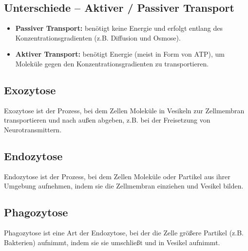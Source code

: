 \documentclass{article}
\begin{document}
\newpage
\subsection{Unterschiede – Aktiver / Passiver Transport}
\begin{itemize}
    \item \textbf{Passiver Transport:} benötigt keine Energie und erfolgt entlang des Konzentrationsgradienten (z.B. Diffusion und Osmose).
    \item \textbf{Aktiver Transport:} benötigt Energie (meist in Form von ATP), um Moleküle gegen den Konzentrationsgradienten zu transportieren.
\end{itemize}

\subsection{Exozytose}
Exozytose ist der Prozess, bei dem Zellen Moleküle in Vesikeln zur Zellmembran transportieren und nach außen abgeben, z.B. bei der Freisetzung von Neurotransmittern.

\subsection{Endozytose} 
Endozytose ist der Prozess, bei dem Zellen Moleküle oder Partikel aus ihrer Umgebung aufnehmen, indem sie die Zellmembran einziehen und Vesikel bilden.

\subsection{Phagozytose}
Phagozytose ist eine Art der Endozytose, bei der die Zelle größere Partikel (z.B. Bakterien) aufnimmt, indem sie sie umschließt und in Vesikel aufnimmt.

\newpage
\end{document}
